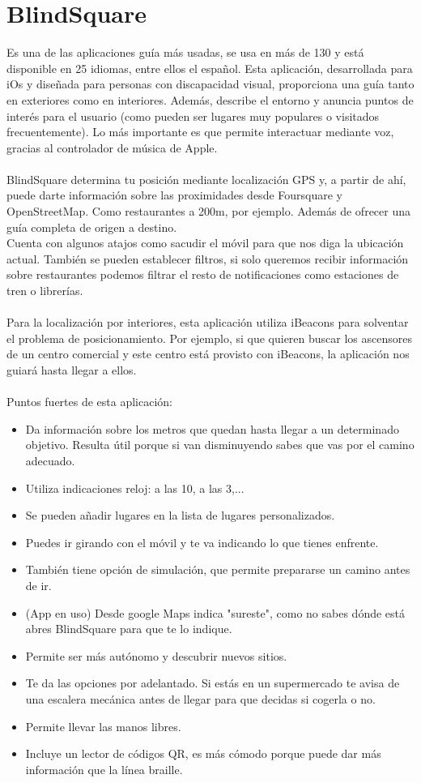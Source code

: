 \documentclass{article}
\begin{document}
		
	\section{BlindSquare}
	Es una de las aplicaciones guía más usadas, se usa en más de 130 y está disponible en 25 idiomas, entre ellos el español. Esta aplicación, desarrollada para iOs y diseñada para personas con discapacidad visual, proporciona una guía tanto en exteriores como en interiores. Además, describe el entorno y anuncia puntos de interés para el usuario (como pueden ser lugares muy populares o visitados frecuentemente). Lo más importante es que permite interactuar mediante voz, gracias al controlador de música de Apple. 
	\\
	\\
	BlindSquare determina tu posición mediante localización GPS y, a partir de ahí, puede darte información sobre las proximidades desde Foursquare y OpenStreetMap. Como restaurantes a 200m, por ejemplo. Además de ofrecer una guía completa de origen a destino.
	\\
	Cuenta con algunos atajos como sacudir el móvil para que nos diga la ubicación actual. También se pueden establecer filtros, si solo queremos recibir información sobre restaurantes podemos filtrar el resto de notificaciones como estaciones de tren o librerías.
	\\
	\\
	Para la localización por interiores, esta aplicación utiliza iBeacons para solventar el problema de posicionamiento. Por ejemplo, si que quieren buscar los ascensores de un centro comercial y este centro está provisto con iBeacons, la aplicación nos guiará hasta llegar a ellos.
	\\
	\\
	Puntos fuertes de esta aplicación:
	\begin{itemize}
		\item Da información sobre los metros que quedan hasta llegar a un determinado objetivo. Resulta útil porque si van disminuyendo sabes que vas por el camino adecuado.
		\item Utiliza indicaciones reloj: a las 10, a las 3,...
		\item Se pueden añadir lugares en la lista de lugares personalizados.
		\item Puedes ir girando con el móvil y te va indicando lo que tienes enfrente. 
		\item También tiene opción de simulación, que permite prepararse un camino antes de ir.
		\item (App en uso) Desde google Maps indica "sureste", como no sabes dónde está abres BlindSquare para que te lo indique.
		\item Permite ser más autónomo y descubrir nuevos sitios.
		\item Te da las opciones por adelantado. Si estás en un supermercado te avisa de una escalera mecánica antes de llegar para que decidas si cogerla o no.
		\item Permite llevar las manos libres.
		\item Incluye un lector de códigos QR, es más cómodo porque puede dar más información que la línea braille.
	\end{itemize}
\end{document}
